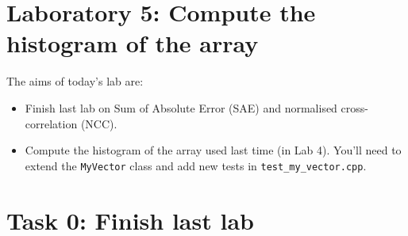 \documentclass[english,a4paper,12pt,oneside]{article}
\begin{document}

\section*{Laboratory 5: Compute the histogram of the array}

%
%
%
%    
%    

The aims of today's lab are:
\begin{itemize}
	\item Finish last lab on Sum of Absolute Error (SAE) and normalised cross-correlation (NCC). 
	\item Compute the histogram of the array used last time (in Lab 4). 
	You'll need to extend the \verb+MyVector+ class and add new tests in \verb+test_my_vector.cpp+. 
\end{itemize}

\section*{Task 0: Finish last lab}
\end{document}
